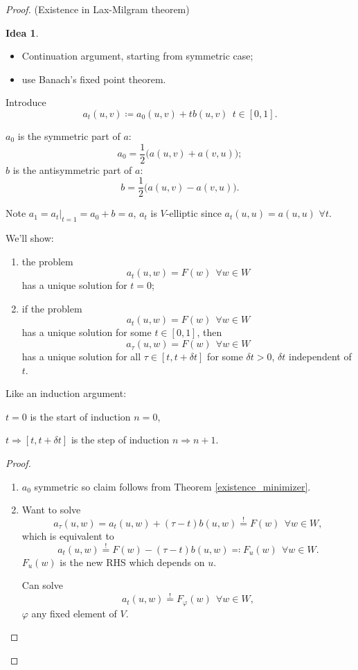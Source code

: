 \documentclass[12pt]{article}
\theoremstyle{definition}
\newtheorem*{idea}{Idea}
\begin{document}
\begin{proof}
(Existence in Lax-Milgram theorem)
\begin{idea}
\begin{itemize}
\item Continuation argument, starting from symmetric case;
\item use Banach's fixed point theorem.
\end{itemize}
\end{idea}

Introduce
\[a_t(u,v)\coloneqq a_0(u,v)+tb(u,v)\ \ t\in[0,1].\]

$a_0$ is the symmetric part of $a$:
\[a_0=\frac{1}{2}\big(a(u,v)+a(v,u)\big);\]
$b$ is the antisymmetric part of $a$:
\[b=\frac{1}{2}\big(a(u,v)-a(v,u)\big).\]

Note $a_1=a_t|_{t=1}=a_0+b=a$, $a_t$ is $V$-elliptic since $a_t(u,u)=a(u,u)$ $\forall t$.

We'll show:
\begin{enumerate}[label=(\arabic*)]
\item the problem
\[a_t(u,w)=F(w)\ \ \forall w\in W\]
has a unique solution for $t=0$;
\item if the problem
\[a_t(u,w)=F(w)\ \ \forall w\in W\]
has a unique solution for some $t\in[0,1]$, then
\[a_{\tau}(u,w)=F(w)\ \ \forall w\in W\]
has a unique solution for all $\tau\in[t,t+\delta t]$ for some $\delta t>0$, $\delta t$ independent of $t$.
\end{enumerate}

Like an induction argument:

$t=0$ is the start of induction $n=0$,

$t\Rightarrow[t,t+\delta t]$ is the step of induction $n\Rightarrow n+1$.

\begin{proof}
\begin{enumerate}[label=(\arabic*)]
\item $a_0$ symmetric so claim follows from Theorem \ref{existence_minimizer}.

\item Want to solve
\[a_{\tau}(u,w)=a_t(u,w)+(\tau-t)b(u,w)\overset{!}{=}F(w)\ \ \forall w\in W,\]
which is equivalent to
\begin{equation}\tag{$**$}\label{LM_u-dep}
a_t(u,w)\overset{!}{=}F(w)-(\tau-t)b(u,w)\eqqcolon F_u(w)\ \ \forall w\in W.
\end{equation}
$F_u(w)$ is the new RHS which depends on $u$.

Can solve
\begin{equation}\tag{$*$}\label{LM_phi-dep}
a_t(u,w)\overset{!}{=}F_{\varphi}(w)\ \ \forall w\in W,
\end{equation}
$\varphi$ any fixed element of $V$.


\end{enumerate}
\end{proof}
\end{proof}
\end{document}
